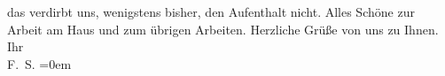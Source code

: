 \begin{ledgroupsized}[t]{13cm}
               das verdirbt uns, wenigstens bisher, den Aufenthalt nicht. Alles Schöne zur Arbeit am
                  Haus und zum übrigen
               Arbeiten. Herzliche Grüße von uns zu Ihnen.\pend
           \pstart
           Ihr {\\[\baselineskip]}\spacefill\mbox{F. S.}\pend
           \leftskip=0em{}
         
         \endnumbering{}\end{ledgroupsized}  \newcommand{\dateiname}{L03549}\newcommand{\titel}{Felix Salten an Arthur Schnitzler, 28. 6. 1910}\newcommand{\editorInnen}{Martin Anton Müller und Laura Untner}
      